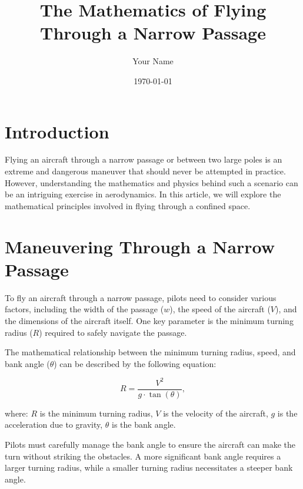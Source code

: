 \documentclass{article}
\title{The Mathematics of Flying Through a Narrow Passage}
\author{Your Name}
\date{\today}
\begin{document}
\maketitle

\section{Introduction}

Flying an aircraft through a narrow passage or between two large poles is an extreme and dangerous maneuver that should never be attempted in practice. However, understanding the mathematics and physics behind such a scenario can be an intriguing exercise in aerodynamics. In this article, we will explore the mathematical principles involved in flying through a confined space.

\section{Maneuvering Through a Narrow Passage}

To fly an aircraft through a narrow passage, pilots need to consider various factors, including the width of the passage ($w$), the speed of the aircraft ($V$), and the dimensions of the aircraft itself. One key parameter is the minimum turning radius ($R$) required to safely navigate the passage.

The mathematical relationship between the minimum turning radius, speed, and bank angle ($\theta$) can be described by the following equation:

\begin{equation}
R = \frac{V^2}{g \cdot \tan(\theta)},
\end{equation}

where:
$R$ is the minimum turning radius,
$V$ is the velocity of the aircraft,
$g$ is the acceleration due to gravity,
$\theta$ is the bank angle.

Pilots must carefully manage the bank angle to ensure the aircraft can make the turn without striking the obstacles. A more significant bank angle requires a larger turning radius, while a smaller turning radius necessitates a steeper bank angle.
\end{document}
